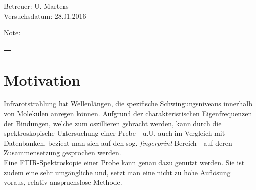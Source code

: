 \documentclass[a4paper,10pt,twocolumn]{article}
\title{\fett{\underline{Protokoll: FTIR-Spektroskopie}}} %
\author{Alexander Jankowski, Philipp Hacker}
\date{\today}
\newcommand{\tilt}[1]{\textit{#1}}
\begin{document}
	\renewcommand*{\equationautorefname}{Gl.}
	\renewcommand*{\figureautorefname}{Abb.}
	\renewcommand*{\tableautorefname}{Tab.}
	\renewcommand*{\sectionautorefname}{Abschn.}
	\renewcommand*{\subsectionautorefname}{Abschn.}
	\renewcommand*{\subsubsectionautorefname}{Abschn.}
	\renewcommand*{\figurename}{Abb. }
	\renewcommand*{\tablename}{Tab.}

	\renewcommand*{\figurename}{Abbildung }
	\renewcommand*{\tablename}{Tabelle}

	
	\onecolumn
	\maketitle

	\begin{center}
		Betreuer: U. Martens\\ %
		Versuchsdatum: 28.01.2016 \\ %
		\begin{table}[h]
			\centering
			Note: %
			\begin{tabularx}{1.5cm}{|X|}
				\hline \\ \\
				\hline
			\end{tabularx}
		\end{table}
	\end{center}


	\vspace*{\fill}
	\tableofcontents
	\vfill
	\clearpage

	\section{Motivation}

		Infrarotstrahlung hat Wellenl\"angen, die spezifische Schwingungsniveaus innerhalb von Molek\"ulen anregen k\"onnen. Aufgrund der charakteristischen Eigenfrequenzen der Bindungen, welche zum oszillieren gebracht werden, kann durch die spektroskopische Untersuchung einer Probe - u.U. auch im Vergleich mit  Datenbanken, bezieht man sich auf den sog. \tilt{fingerprint}-Bereich - auf deren Zusammensetzung gesprochen werden.\\
		Eine FTIR-Spektroskopie einer Probe kann genau dazu genutzt werden. Sie ist zudem eine sehr umg\"angliche und, setzt man eine nicht zu hohe Aufl\"osung voraus, relativ anspruchslose Methode.

	\twocolumn
\end{document}
